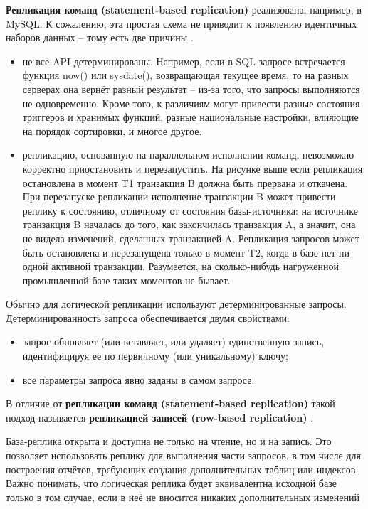 \textbf{Репликация команд (statement-based replication)} реализована, например, в MySQL. К сожалению, эта простая схема не
приводит к появлению идентичных наборов данных – тому есть две причины \autocite{PhysLogPeplic}.
\begin{itemize}
    \item не все API детерминированы. Например, если в SQL-запросе встречается функция now() или sysdate(), возвращающая текущее время, то на разных серверах она вернёт разный результат – из-за того, что запросы выполняются не одновременно. Кроме того, к различиям могут привести разные состояния триггеров и хранимых функций, разные национальные настройки, влияющие на порядок сортировки, и многое другое.
    \item репликацию, основанную на параллельном исполнении команд, невозможно корректно приостановить и перезапустить. На рисунке выше если репликация остановлена в момент T1 транзакция B должна быть прервана и откачена. При перезапуске репликации исполнение транзакции B может привести реплику к состоянию, отличному от состояния базы-источника: на источнике транзакция B началась до того, как закончилась транзакция A, а значит, она не видела изменений, сделанных транзакцией A. Репликация запросов может быть остановлена и перезапущена только в момент T2, когда в базе нет ни одной активной транзакции. Разумеется, на сколько-нибудь нагруженной промышленной базе таких моментов не бывает.
\end{itemize}

Обычно для логической репликации используют детерминированные запросы. Детерминированность запроса обеспечивается двумя
свойствами:
\begin{itemize}
    \item запрос обновляет (или вставляет, или удаляет) единственную запись, идентифицируя её по первичному (или уникальному) ключу;
    \item все параметры запроса явно заданы в самом запросе.
\end{itemize}

В отличие от \textbf{репликации команд (statement-based replication)} такой подход называется \textbf{репликацией
записей (row-based replication)} \autocite{PhysLogPeplic}.

База-реплика открыта и доступна не только на чтение, но и на запись. Это позволяет использовать реплику для выполнения
части запросов, в том числе для построения отчётов, требующих создания дополнительных таблиц или индексов. Важно
понимать, что логическая реплика будет эквивалентна исходной базе только в том случае, если в неё не вносится никаких
дополнительных изменений

